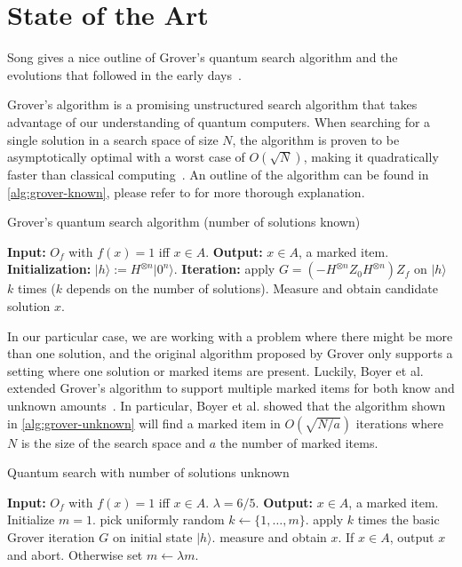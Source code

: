 \section{State of the Art}\label{sec:state-of-the-art}

Song gives a nice outline of Grover's quantum search algorithm and the evolutions that followed in the early days~\cite{song2017early}.

Grover's algorithm is a promising unstructured search algorithm that takes advantage of our understanding of quantum computers.
When searching for a single solution in a search space of size $N$, the algorithm is proven to be asymptotically optimal with a worst case of $O\left(\sqrt{N}\right)$, making it quadratically faster than classical computing~\cite{grover1996fast}.
An outline of the algorithm can be found in \autoref{alg:grover-known}, please refer to \cite{song2017early} for more thorough explanation.

\begin{algorithm}
\caption{Grover's quantum search algorithm (number of solutions known)~\cite{song2017early}}
\begin{algorithmic}[1]
\State \textbf{Input:} $O_f$ with $f(x) = 1$ iff $x \in A$.
\State \textbf{Output:} $x \in A$, a marked item.
\State \textbf{Initialization:} $\lvert h \rangle := H^{\otimes n} \lvert 0^n \rangle$.
\State \textbf{Iteration:} apply $G = (-H^{\otimes n} Z_0 H^{\otimes n}) Z_f$ on $\lvert h \rangle$ $k$ times ($k$ depends on the number of solutions).
\State Measure and obtain candidate solution $x$.
\end{algorithmic}
\end{algorithm}\label{alg:grover-known}

In our particular case, we are working with a problem where there might be more than one solution, and the original algorithm proposed by Grover only supports a setting where one solution or marked items are present.
Luckily, Boyer et al. extended Grover's algorithm to support multiple marked items for both know and unknown amounts~\cite{boyer1998tight}.
In particular, Boyer et al. showed that the algorithm shown in \ref{alg:grover-unknown} will find a marked item in $O(\sqrt{N/a})$ iterations where $N$ is the size of the search space and $a$ the number of marked items.

\begin{algorithm}
\caption{Quantum search with number of solutions unknown~\cite{song2017early}}
\begin{algorithmic}[1]
\State \textbf{Input:} $O_f$ with $f(x) = 1$ iff $x \in A$. $\lambda = 6/5$.
\State \textbf{Output:} $x \in A$, a marked item.
\State Initialize $m = 1$.
    \State pick uniformly random $k \leftarrow \{1, \ldots, m\}$.
    \State apply $k$ times the basic Grover iteration $G$ on initial state $\lvert h \rangle$.
    \State measure and obtain $x$. If $x \in A$, output $x$ and abort. Otherwise set $m \leftarrow \lambda m$.
\EndWhile
\end{algorithmic}
\end{algorithm}\label{alg:grover-unknown}
